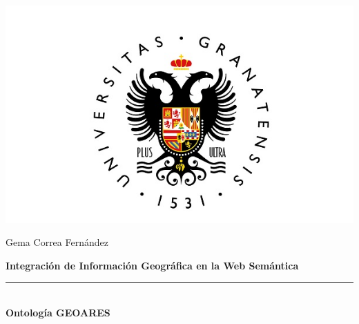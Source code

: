 \begin{titlepage}
 
 
\setlength{\centeroffset}{-0.5\oddsidemargin}
\addtolength{\centeroffset}{0.5\evensidemargin}
\thispagestyle{empty}

\noindent\hspace*{\centeroffset}\begin{minipage}{\textwidth}

\centering

% 

\vspace{0.15cm}

\includegraphics[scale=0.25]{imagenes/ugr_logo.jpg} 
 
\begin{center}
    Gema Correa Fernández
\end{center}

\vspace{0.5in}
 
{\LARGE\bfseries Integración de Información Geográfica en la Web Semántica\\
}
\noindent\rule[-1ex]{\textwidth}{0.5pt}\\[3.5ex]
{\Large\bfseries Ontología GEOARES\\[4cm]}
\end{minipage}

\vspace{4.75cm}
\noindent\hspace*{\centeroffset}\begin{minipage}{\textwidth}
\centering


\end{minipage}
\end{titlepage}
